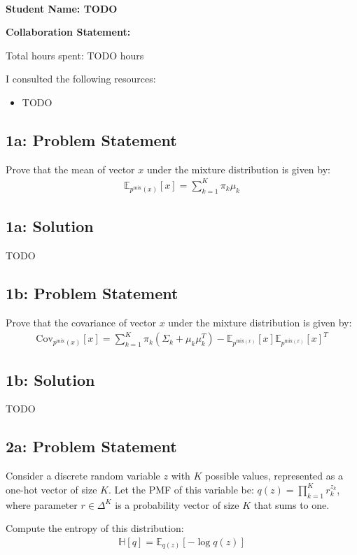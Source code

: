 \documentclass[10pt]{article}
\newcommand{\officialdirections}[1]{{\color{blue} #1}}
\begin{document}
~~\\ %
\Large{\bf Student Name: TODO}

\Large{\bf Collaboration Statement:}

Total hours spent: TODO hours

I consulted the following resources:
\begin{itemize}
\item TODO
\end{itemize}

\tableofcontents

\newpage
\officialdirections{
\subsection*{1a: Problem Statement}
Prove that the mean of vector $x$ under the mixture distribution is given by:
\begin{align}
\mathbb{E}_{p^{\text{mix}}(x)}[x] = \sum_{k=1}^K \pi_k \mu_k
\end{align}
}

\subsection{1a: Solution}

TODO

\newpage
\officialdirections{
\subsection*{1b: Problem Statement}
Prove that the covariance of vector $x$ under the mixture distribution is given by:
\begin{align}
\text{Cov}_{p^{\text{mix}}(x)}[x] = \sum_{k=1}^K \pi_k (\Sigma_k + \mu_k \mu_k^T ) - \mathbb{E}_{p^{\text{mix}(x)}}[x] \mathbb{E}_{p^{\text{mix}(x)}}[x]^T
\end{align}
}
\subsection{1b: Solution}

TODO


\newpage

\officialdirections{
\subsection*{2a: Problem Statement}
Consider a discrete random variable $z$ with $K$ possible values, represented as a one-hot vector of size $K$. Let the PMF of this variable be: $q(z) = \prod_{k=1}^K r_k^{z_k}$, where parameter $r \in \Delta^K$ is a probability vector of size $K$ that sums to one.

Compute the entropy of this distribution:
\begin{align}
\mathbb{H}[q] = \mathbb{E}_{q(z)}[ - \log q(z) ]
\end{align}
}
\end{document}
